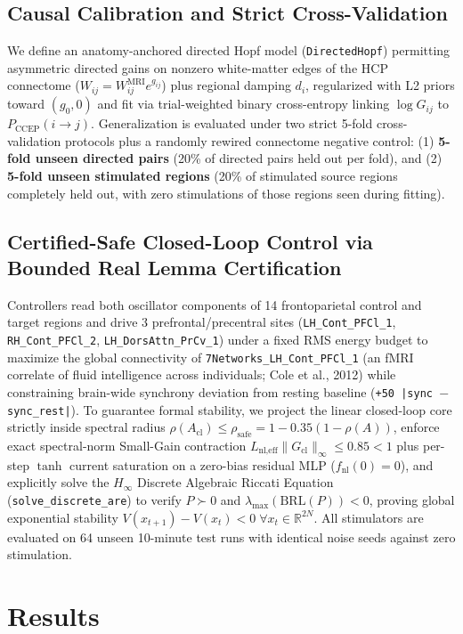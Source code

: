 \documentclass[11pt,a4paper]{article}
\begin{document}
\subsection{Causal Calibration and Strict Cross-Validation}
We define an anatomy-anchored directed Hopf model (\texttt{DirectedHopf}) permitting asymmetric directed gains on nonzero white-matter edges of the HCP connectome ($W_{ij} = W_{ij}^{\text{MRI}} e^{g_{ij}}$) plus regional damping $d_i$, regularized with L2 priors toward $(g_0, 0)$ and fit via trial-weighted binary cross-entropy linking $\log G_{ij}$ to $P_{\text{CCEP}}(i \to j)$. Generalization is evaluated under two strict 5-fold cross-validation protocols plus a randomly rewired connectome negative control: (1) \textbf{5-fold unseen directed pairs} (20\% of directed pairs held out per fold), and (2) \textbf{5-fold unseen stimulated regions} (20\% of stimulated source regions completely held out, with zero stimulations of those regions seen during fitting).

\subsection{Certified-Safe Closed-Loop Control via Bounded Real Lemma Certification}
Controllers read both oscillator components of 14 frontoparietal control and target regions and drive 3 prefrontal/precentral sites (\texttt{LH\_Cont\_PFCl\_1}, \texttt{RH\_Cont\_PFCl\_2}, \texttt{LH\_DorsAttn\_PrCv\_1}) under a fixed RMS energy budget to maximize the global connectivity of \texttt{7Networks\_LH\_Cont\_PFCl\_1} (an fMRI correlate of fluid intelligence across individuals; Cole et al., 2012) while constraining brain-wide synchrony deviation from resting baseline (\texttt{+50 |sync $-$ sync\_rest|}). To guarantee formal stability, we project the linear closed-loop core strictly inside spectral radius $\rho(A_{\text{cl}}) \le \rho_{\text{safe}} = 1 - 0.35(1 - \rho(A))$, enforce exact spectral-norm Small-Gain contraction $L_{\text{nl,eff}} \|G_{\text{cl}}\|_\infty \le 0.85 < 1$ plus per-step $\tanh$ current saturation on a zero-bias residual MLP ($f_{\text{nl}}(0) = 0$), and explicitly solve the $H_\infty$ Discrete Algebraic Riccati Equation (\texttt{solve\_discrete\_are}) to verify $P \succ 0$ and $\lambda_{\max}(\text{BRL}(P)) < 0$, proving global exponential stability $V(x_{t+1}) - V(x_t) < 0\;\forall x_t \in \mathbb{R}^{2N}$. All stimulators are evaluated on 64 unseen 10-minute test runs with identical noise seeds against zero stimulation.

\section{Results}
\end{document}
